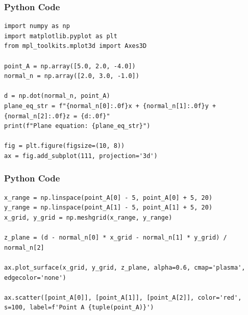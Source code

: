 \documentclass{beamer}
\begin{document}
\begin{frame}[fragile]
    \frametitle{Python Code}
    \begin{lstlisting}
import numpy as np
import matplotlib.pyplot as plt
from mpl_toolkits.mplot3d import Axes3D

point_A = np.array([5.0, 2.0, -4.0])
normal_n = np.array([2.0, 3.0, -1.0])

d = np.dot(normal_n, point_A)
plane_eq_str = f"{normal_n[0]:.0f}x + {normal_n[1]:.0f}y + {normal_n[2]:.0f}z = {d:.0f}"
print(f"Plane equation: {plane_eq_str}")

fig = plt.figure(figsize=(10, 8))
ax = fig.add_subplot(111, projection='3d')
    \end{lstlisting}
\end{frame}

\begin{frame}[fragile]
    \frametitle{Python Code}
    \begin{lstlisting}
x_range = np.linspace(point_A[0] - 5, point_A[0] + 5, 20)
y_range = np.linspace(point_A[1] - 5, point_A[1] + 5, 20)
x_grid, y_grid = np.meshgrid(x_range, y_range)

z_plane = (d - normal_n[0] * x_grid - normal_n[1] * y_grid) / normal_n[2]

ax.plot_surface(x_grid, y_grid, z_plane, alpha=0.6, cmap='plasma', edgecolor='none')

ax.scatter([point_A[0]], [point_A[1]], [point_A[2]], color='red', s=100, label=f'Point A {tuple(point_A)}')

   
    \end{lstlisting}
\end{frame}
\end{document}
